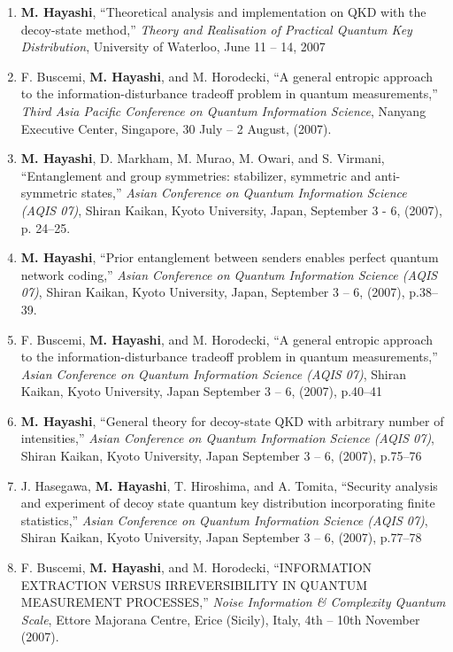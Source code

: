 \documentclass[a4paper,12pt,oneside]{article}
\begin{document}
\begin{enumerate}
\item
\textbf{M. Hayashi}, ``Theoretical analysis and implementation on QKD with the decoy-state method,'' 
{\em Theory and Realisation of Practical Quantum Key Distribution}, 
University of Waterloo, June 11 -- 14, 2007

\item
F. Buscemi, \textbf{M. Hayashi}, and M. Horodecki, ``A general entropic approach to the information-disturbance tradeoff problem in quantum measurements,'' 
{\em Third Asia Pacific Conference on Quantum Information Science}, 
Nanyang Executive Center, Singapore, 
30 July -- 2 August, (2007).

\item
\textbf{M. Hayashi}, D. Markham, M. Murao, M. Owari, and S. Virmani, ``Entanglement and group symmetries: stabilizer, symmetric and anti-symmetric states,'' 
{\em Asian Conference on Quantum Information Science (AQIS 07)}, 
Shiran Kaikan, Kyoto University, Japan, September 3 - 6, (2007), p. 24--25.

\item
\textbf{M. Hayashi}, ``Prior entanglement between senders enables perfect quantum network coding,'' {\em Asian Conference on Quantum Information Science (AQIS 07)}, 
Shiran Kaikan, Kyoto University, Japan, 
September 3 -- 6, (2007), p.38--39.

\item
F. Buscemi, \textbf{M. Hayashi}, and M. Horodecki, ``A general entropic approach to the information-disturbance tradeoff problem in quantum measurements,'' 
{\em Asian Conference on Quantum Information Science (AQIS 07)}, 
Shiran Kaikan, Kyoto University, Japan September 3 -- 6, (2007), p.40--41

\item
\textbf{M. Hayashi}, ``General theory for decoy-state QKD with arbitrary number of intensities,'' 
{\em Asian Conference on Quantum Information Science (AQIS 07)}, 
Shiran Kaikan, Kyoto University, Japan September 3 -- 6, (2007), p.75--76

\item
J. Hasegawa, \textbf{M. Hayashi}, T. Hiroshima, and A. Tomita, 
``Security analysis and experiment of decoy state quantum key distribution incorporating finite statistics,'' 
{\em Asian Conference on Quantum Information Science (AQIS 07)}, 
Shiran Kaikan, Kyoto University, Japan September 3 -- 6, (2007), p.77--78

\item
F. Buscemi, \textbf{M. Hayashi}, and M. Horodecki, ``INFORMATION EXTRACTION VERSUS IRREVERSIBILITY IN QUANTUM MEASUREMENT PROCESSES,'' 
{\em Noise Information \& Complexity \@ Quantum Scale}, 
Ettore Majorana Centre, Erice (Sicily), Italy, 4th -- 10th November (2007). 



\end{enumerate}
\end{document}
